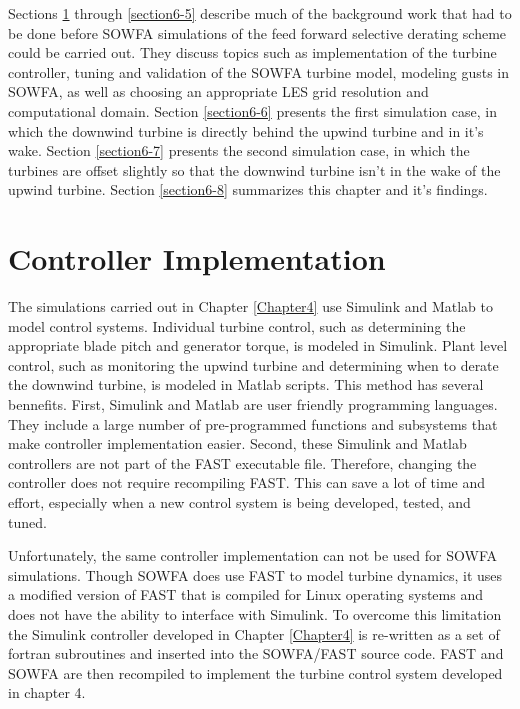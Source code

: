 Sections \ref{section6-2} through \ref{section6-5} describe much of the background work that had to be done before SOWFA simulations of the feed forward selective derating scheme could be carried out. They discuss topics such as implementation of the turbine controller, tuning and validation of the SOWFA turbine model, modeling gusts in SOWFA, as well as choosing an appropriate LES grid resolution and computational domain. Section \ref{section6-6} presents the first simulation case, in which the downwind turbine is directly behind the upwind turbine and in it's wake. Section \ref{section6-7} presents the second simulation case, in which the turbines are offset slightly so that the downwind turbine isn't in the wake of the upwind turbine. Section \ref{section6-8} summarizes this chapter and it's findings.




\section{Controller Implementation} \label{section6-2}

The simulations carried out in Chapter \ref{Chapter4} use Simulink and Matlab to model control systems. Individual turbine control, such as determining the appropriate blade pitch and generator torque, is modeled in Simulink. Plant level control, such as monitoring the upwind turbine and determining when to derate the downwind turbine, is modeled in Matlab scripts. This method has several bennefits. First, Simulink and Matlab are user friendly programming languages.  They include a large number of pre-programmed functions and subsystems that make controller implementation easier. Second, these Simulink and Matlab controllers are not part of the FAST executable file. Therefore, changing the controller does not require recompiling FAST. This can save a lot of time and effort, especially when a new control system is being developed, tested, and tuned. 

Unfortunately, the same controller implementation can not be used for SOWFA simulations. Though SOWFA does use FAST to model turbine dynamics, it uses a modified version of FAST that is compiled for Linux operating systems and does not have the ability to interface with Simulink. To overcome this limitation the Simulink controller developed in Chapter \ref{Chapter4} is re-written as a set of fortran subroutines and inserted into the SOWFA/FAST source code. FAST and SOWFA are then recompiled to implement the turbine control system developed in chapter 4. 

